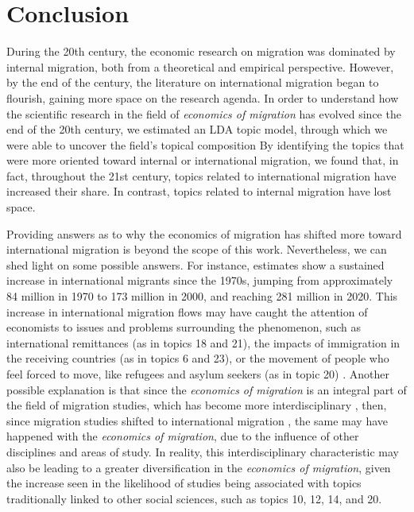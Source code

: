 \section{Conclusion} \label{conclusion}

During the 20th century, the economic research on migration was dominated by internal migration, both from a theoretical and empirical perspective. However, by the end of the century, the literature on international migration began to flourish, gaining more space on the research agenda. In order to understand how the scientific research in the field of \textit{economics of migration} has evolved since the end of the 20th century, we estimated an LDA topic model, through which we were able to uncover the field's topical composition By identifying the topics that were more oriented toward internal or international migration, we found that, in fact, throughout the 21st century, topics related to international migration have increased their share. In contrast, topics related to internal migration have lost space.

Providing answers as to why the economics of migration has shifted more toward international migration is beyond the scope of this work. Nevertheless, we can shed light on some possible answers. For instance, estimates show a sustained increase in international migrants since the 1970s, jumping from approximately 84 million in 1970 to 173 million in 2000, and reaching 281 million in 2020. This increase in international migration flows may have caught the attention of economists to issues and problems surrounding the phenomenon, such as international remittances (as in topics 18 and 21), the impacts of immigration in the receiving countries (as in topics 6 and 23), or the movement of people who feel forced to move, like refugees and asylum seekers (as in topic 20) \citep{mcauliffe_world_2024}. Another possible explanation is that since the \textit{economics of migration} is an integral part of the field of migration studies, which has become more interdisciplinary \citep{levy_between_2020}, then, since migration studies shifted to international migration \citep{cushing_crossing_2004, king_mind_2010}, the same may have happened with the \textit{economics of migration}, due to the influence of other disciplines and areas of study. In reality, this interdisciplinary characteristic may also be leading to a greater diversification in the \textit{economics of migration}, given the increase seen in the likelihood of studies being associated with topics traditionally linked to other social sciences, such as topics 10, 12, 14, and 20.

